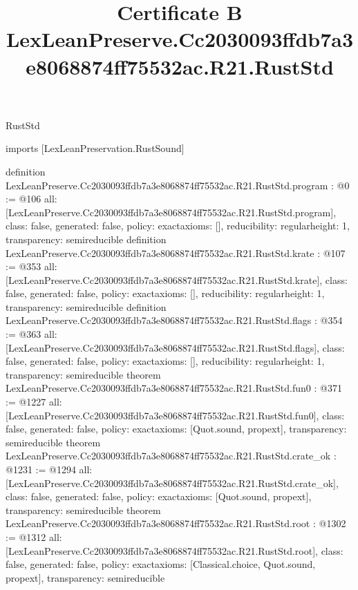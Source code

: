 \begin{lexlean}{RustStd}
\title{Certificate B LexLeanPreserve.Cc2030093ffdb7a3e8068874ff75532ac.R21.RustStd}
\begin{coremodule}
imports [LexLeanPreservation.RustSound]

definition LexLeanPreserve.Cc2030093ffdb7a3e8068874ff75532ac.R21.RustStd.program : @0 := @106 {
  all: [LexLeanPreserve.Cc2030093ffdb7a3e8068874ff75532ac.R21.RustStd.program],
  class: false,
  generated: false,
  policy: exact{axioms: []},
  reducibility: regular{height: 1},
  transparency: semireducible
}
definition LexLeanPreserve.Cc2030093ffdb7a3e8068874ff75532ac.R21.RustStd.krate : @107 := @353 {
  all: [LexLeanPreserve.Cc2030093ffdb7a3e8068874ff75532ac.R21.RustStd.krate],
  class: false,
  generated: false,
  policy: exact{axioms: []},
  reducibility: regular{height: 1},
  transparency: semireducible
}
definition LexLeanPreserve.Cc2030093ffdb7a3e8068874ff75532ac.R21.RustStd.flags : @354 := @363 {
  all: [LexLeanPreserve.Cc2030093ffdb7a3e8068874ff75532ac.R21.RustStd.flags],
  class: false,
  generated: false,
  policy: exact{axioms: []},
  reducibility: regular{height: 1},
  transparency: semireducible
}
theorem LexLeanPreserve.Cc2030093ffdb7a3e8068874ff75532ac.R21.RustStd.fun0 : @371 := @1227 {
  all: [LexLeanPreserve.Cc2030093ffdb7a3e8068874ff75532ac.R21.RustStd.fun0],
  class: false,
  generated: false,
  policy: exact{axioms: [Quot.sound, propext]},
  transparency: semireducible
}
theorem LexLeanPreserve.Cc2030093ffdb7a3e8068874ff75532ac.R21.RustStd.crate_ok : @1231 := @1294 {
  all: [LexLeanPreserve.Cc2030093ffdb7a3e8068874ff75532ac.R21.RustStd.crate_ok],
  class: false,
  generated: false,
  policy: exact{axioms: [Quot.sound, propext]},
  transparency: semireducible
}
theorem LexLeanPreserve.Cc2030093ffdb7a3e8068874ff75532ac.R21.RustStd.root : @1302 := @1312 {
  all: [LexLeanPreserve.Cc2030093ffdb7a3e8068874ff75532ac.R21.RustStd.root],
  class: false,
  generated: false,
  policy: exact{axioms: [Classical.choice, Quot.sound, propext]},
  transparency: semireducible
}


\end{coremodule}
\end{lexlean}
